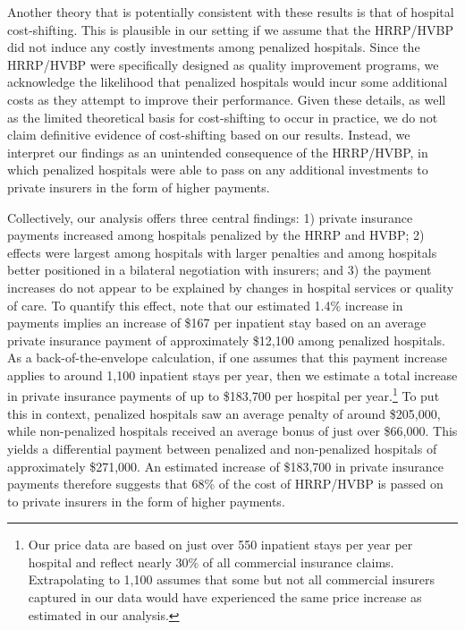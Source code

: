 \documentclass[12pt]{article}
\begin{document}
Another theory that is potentially consistent with these results is that of hospital cost-shifting. This is plausible in our setting if we assume that the HRRP/HVBP did not induce any costly investments among penalized hospitals. Since the HRRP/HVBP were specifically designed as quality improvement programs, we acknowledge the likelihood that penalized hospitals would incur some additional costs as they attempt to improve their performance. Given these details, as well as the limited theoretical basis for cost-shifting to occur in practice, we do not claim definitive evidence of cost-shifting based on our results. Instead, we interpret our findings as an unintended consequence of the HRRP/HVBP, in which penalized hospitals were able to pass on any additional investments to private insurers in the form of higher payments.

Collectively, our analysis offers three central findings: 1) private insurance payments increased among hospitals penalized by the HRRP and HVBP; 2) effects were largest among hospitals with larger penalties and among hospitals better positioned in a bilateral negotiation with insurers; and 3) the payment increases do not appear to be explained by changes in hospital services or quality of care. To quantify this effect, note that our estimated 1.4\% increase in payments implies an increase of \$167 per inpatient stay based on an average private insurance payment of approximately \$12,100 among penalized hospitals. As a back-of-the-envelope calculation, if one assumes that this payment increase applies to around 1,100 inpatient stays per year, then we estimate a total increase in private insurance payments of up to \$183,700 per hospital per year.\footnote{Our price data are based on just over 550 inpatient stays per year per hospital and reflect nearly 30\% of all commercial insurance claims. Extrapolating to 1,100 assumes that some but not all commercial insurers captured in our data would have experienced the same price increase as estimated in our analysis.} To put this in context, penalized hospitals saw an average penalty of around \$205,000, while non-penalized hospitals received an average bonus of just over \$66,000. This yields a differential payment between penalized and non-penalized hospitals of approximately \$271,000. An estimated increase of \$183,700 in private insurance payments therefore suggests that 68\% of the cost of HRRP/HVBP is passed on to private insurers in the form of higher payments.
\end{document}
